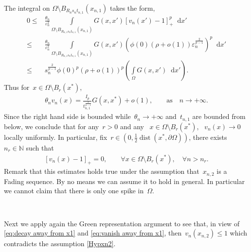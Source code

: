 \documentclass[10pt]{amsart}
\newcommand{\parenthesis}[1]{\left(#1\right)} %
\newcommand{\dd}{\mathop{}\!\mathrm{d}}
\newcommand{\eps}{\varepsilon}
\newcommand{\p}{\partial}
\DeclareMathOperator{\dist}{dist}
\renewcommand{\to}{\rightarrow}
\begin{document}
    The integral on $\Omega\setminus B_{R_n s_n t_{n,1}}(x_{n,1})$ takes the form,
    \begin{align*}
        0\leq &\frac{\theta_n}{\eps_n^2}\int\limits_{\Omega\setminus B_{R_{n,1} s_n t_{n,1}}(x_{n,1})} G(x,x')[v_n(x')-1]_+^p\dd{x'} \\
        \leq&\frac{\theta_n}{\eps_n^2}\int\limits_{\Omega\setminus B_{R_{n,1} s_n t_{n,1}}(x_{n,1})} G(x,x')(\phi(0)(\rho+o(1)) \eps_n^{\frac{2}{p-1}})^p \dd{x'} \\
        \leq & s_n^{\frac{2}{p-1}}\phi(0)^p (\rho+o(1))^p \parenthesis{\int\limits_{\Omega}G(x,x')\dd{x'}}.
    \end{align*}
    Thus for~$x\in \Omega\setminus B_r(x^*)$,
    \begin{align*}
        \theta_n v_n(x)= \frac{I_p}{t_{n,1}^{\frac{2}{p-1}}}G(x,x^*)+ o(1), \qquad \mbox{as} \quad n\to+\infty.
    \end{align*}
    Since the right hand side is bounded while~$\theta_n\to+\infty$ and~$t_{n,1}$ are bounded from below, we conclude that for any~$r>0$ and any~
    $x\in \Omega\setminus B_r(x^*)$, ~$v_n(x)\to 0$ locally uniformly.
    In particular, fix~$r\in (0, \frac{1}{2}\dist(x^*,\p\Omega))$, there exists~$n_r\in\mathbb{N}$ such that
    \begin{align}\label{eq:vanish away from x1}
        [v_n(x)-1]_+ =0,   \qquad  \forall x \in \Omega\setminus B_r(x^*), \quad \forall n>n_r.
    \end{align}
    Remark that this estimates holds true under the assumption that~$x_{n,2}$ is a Fading sequence. By no means we can assume it to hold in general.
     In particular we cannot claim that there is only one spike in~$\Omega$.

    \

    Next we apply again the Green representation argument to see that, in view of \eqref{eq:decay away from x1} and \eqref{eq:vanish away from x1},
    then~$v_n(x_{n,2})\leq 1$ which contradicts the assumption \eqref{Hypxn2}.

    \
\end{document}
